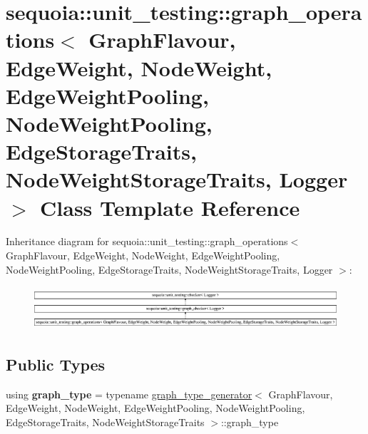 \hypertarget{classsequoia_1_1unit__testing_1_1graph__operations}{}\section{sequoia\+::unit\+\_\+testing\+::graph\+\_\+operations$<$ Graph\+Flavour, Edge\+Weight, Node\+Weight, Edge\+Weight\+Pooling, Node\+Weight\+Pooling, Edge\+Storage\+Traits, Node\+Weight\+Storage\+Traits, Logger $>$ Class Template Reference}
\label{classsequoia_1_1unit__testing_1_1graph__operations}
Inheritance diagram for sequoia\+::unit\+\_\+testing\+::graph\+\_\+operations$<$ Graph\+Flavour, Edge\+Weight, Node\+Weight, Edge\+Weight\+Pooling, Node\+Weight\+Pooling, Edge\+Storage\+Traits, Node\+Weight\+Storage\+Traits, Logger $>$\+:\begin{figure}[H]
\begin{center}
\leavevmode
\includegraphics[height=1.609195cm]{classsequoia_1_1unit__testing_1_1graph__operations}
\end{center}
\end{figure}
\subsection*{Public Types}
\begin{DoxyCompactItemize}
\item 
\mbox{\label{classsequoia_1_1unit__testing_1_1graph__operations_a8816f04b3da4b1d9d0de9a220b2629d4}} 
using {\bfseries graph\+\_\+type} = typename \mbox{\hyperlink{structsequoia_1_1unit__testing_1_1graph__type__generator}{graph\+\_\+type\+\_\+generator}}$<$ Graph\+Flavour, Edge\+Weight, Node\+Weight, Edge\+Weight\+Pooling, Node\+Weight\+Pooling, Edge\+Storage\+Traits, Node\+Weight\+Storage\+Traits $>$\+::graph\+\_\+type
\end{DoxyCompactItemize}
